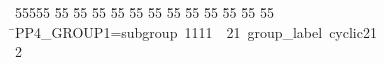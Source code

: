 %
%
\begin{tabbing}
55555 \= 55 \= 55 \= 55 \= 55 \= 55 \= 55 \= 55 \= 55 \= 55 \= 55 \= 55 \= 55 \= \>PP4\_GROUP1=subgroup\ 1111\ \ 21\ group\_label\ cyclic21\\[0pt]
2\>\end{tabbing}
